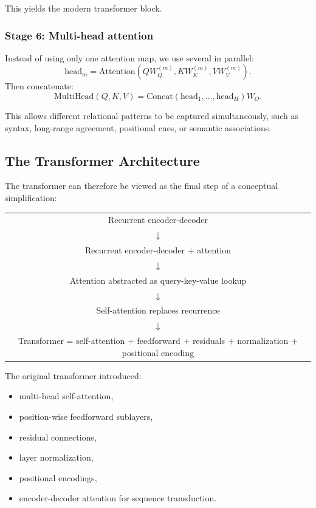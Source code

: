 This yields the modern transformer block.

\subsubsection{Stage 6: Multi-head attention}

Instead of using only one attention map, we use several in parallel:
\[
\mathrm{head}_m = \mathrm{Attention}(QW_Q^{(m)}, KW_K^{(m)}, VW_V^{(m)}).
\]
Then concatenate:
\[
\mathrm{MultiHead}(Q,K,V)
=
\mathrm{Concat}(\mathrm{head}_1,\dots,\mathrm{head}_H)W_O.
\]

This allows different relational patterns to be captured simultaneously, such as syntax, long-range agreement, positional cues, or semantic associations.

\subsection{The Transformer Architecture}

The transformer can therefore be viewed as the final step of a conceptual simplification:

\begin{center}
\begin{tabular}{c}
Recurrent encoder-decoder \\[0.25em]
\(\downarrow\) \\[0.25em]
Recurrent encoder-decoder + attention \\[0.25em]
\(\downarrow\) \\[0.25em]
Attention abstracted as query-key-value lookup \\[0.25em]
\(\downarrow\) \\[0.25em]
Self-attention replaces recurrence \\[0.25em]
\(\downarrow\) \\[0.25em]
Transformer = self-attention + feedforward + residuals + normalization + positional encoding
\end{tabular}
\end{center}

The original transformer introduced:
\begin{itemize}
    \item multi-head self-attention,
    \item position-wise feedforward sublayers,
    \item residual connections,
    \item layer normalization,
    \item positional encodings,
    \item encoder-decoder attention for sequence transduction.
\end{itemize}

